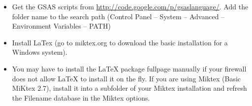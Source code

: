 \begin{itemize}
\item Get the GSAS scripts from \url{http://code.google.com/p/gsaslanguage/}. Add the folder name to the search path (Control Panel -- System -- Advanced
-- Environment Variables -- PATH)
\item Install LaTex (go to miktex.org to download the basic installation for a Windows system).
\item You may have to install the LaTeX package fullpage manually if your firewall does not allow LaTeX to install it on the fly. If you are using Miktex (Basic MiKtex 2.7), install it into a subfolder of your Miktex installation and refresh the Filename database in the Miktex options.
\end{itemize}

